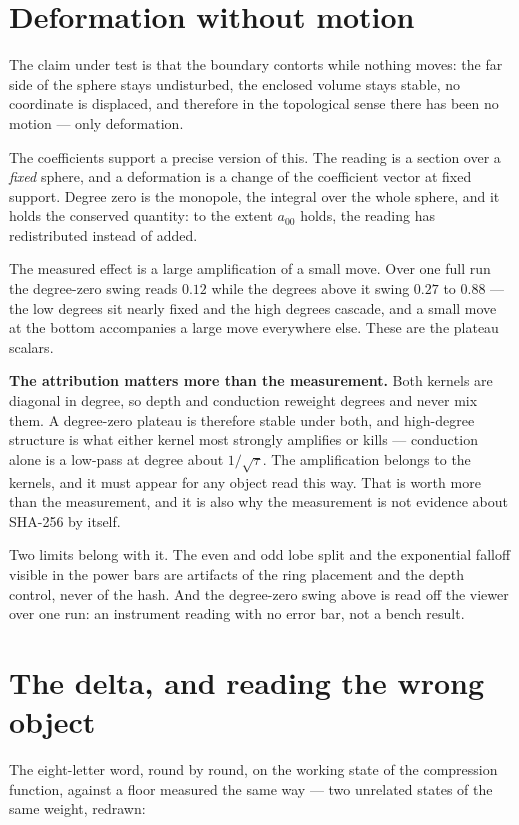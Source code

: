 \section{Deformation without motion}

The claim under test is that the boundary contorts while nothing moves: the far side of the sphere stays undisturbed, the enclosed volume stays stable, no coordinate is displaced, and therefore in the topological sense there has been no motion --- only deformation.

The coefficients support a precise version of this. The reading is a section over a \emph{fixed} sphere, and a deformation is a change of the coefficient vector at fixed support. Degree zero is the monopole, the integral over the whole sphere, and it holds the conserved quantity: to the extent \(a_{00}\) holds, the reading has redistributed instead of added.

The measured effect is a large amplification of a small move. Over one full run the degree-zero swing reads \(0.12\) while the degrees above it swing \(0.27\) to \(0.88\) --- the low degrees sit nearly fixed and the high degrees cascade, and a small move at the bottom accompanies a large move everywhere else. These are the plateau scalars.

\textbf{The attribution matters more than the measurement.} Both kernels are diagonal in degree, so depth and conduction reweight degrees and never mix them. A degree-zero plateau is therefore stable under both, and high-degree structure is what either kernel most strongly amplifies or kills --- conduction alone is a low-pass at degree about \(1/\sqrt{\tau}\). The amplification belongs to the kernels, and it must appear for any object read this way. That is worth more than the measurement, and it is also why the measurement is not evidence about SHA-256 by itself.

Two limits belong with it. The even and odd lobe split and the exponential falloff visible in the power bars are artifacts of the ring placement and the depth control, never of the hash. And the degree-zero swing above is read off the viewer over one run: an instrument reading with no error bar, not a bench result.

\section{The delta, and reading the wrong object}

The eight-letter word, round by round, on the working state of the compression function, against a floor measured the same way --- two unrelated states of the same weight, redrawn:

